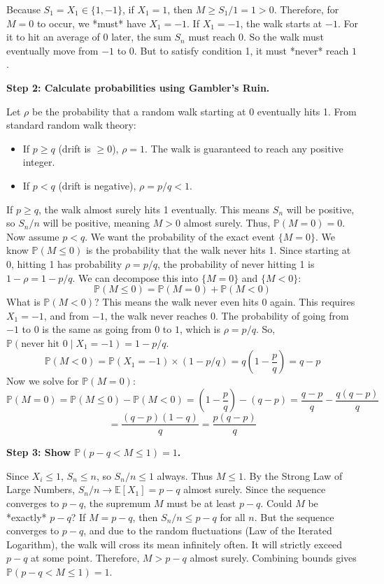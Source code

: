 \begin{solution}
Because $S_1 = X_1 \in \{1, -1\}$, if $X_1 = 1$, then $M \geq S_1/1 = 1 > 0$. Therefore, for $M=0$ to occur, we *must* have $X_1 = -1$.
If $X_1 = -1$, the walk starts at $-1$. For it to hit an average of 0 later, the sum $S_n$ must reach 0. So the walk must eventually move from $-1$ to $0$. But to satisfy condition 1, it must *never* reach $1$.

\textbf{Step 2: Calculate probabilities using Gambler's Ruin.}

Let $\rho$ be the probability that a random walk starting at 0 eventually hits 1. From standard random walk theory:
\begin{itemize}
    \item If $p \geq q$ (drift is $\ge 0$), $\rho = 1$. The walk is guaranteed to reach any positive integer.
    \item If $p < q$ (drift is negative), $\rho = p/q < 1$.
\end{itemize}

If $p \ge q$, the walk almost surely hits 1 eventually. This means $S_n$ will be positive, so $S_n/n$ will be positive, meaning $M > 0$ almost surely. Thus, $\mathbb{P}(M=0) = 0$.
Now assume $p < q$. We want the probability of the exact event $\{M=0\}$.
We know $\mathbb{P}(M \leq 0)$ is the probability that the walk never hits 1. Since starting at 0, hitting 1 has probability $\rho = p/q$, the probability of never hitting 1 is $1 - \rho = 1 - p/q$.
We can decompose this into $\{M=0\}$ and $\{M<0\}$:
\[ \mathbb{P}(M \leq 0) = \mathbb{P}(M=0) + \mathbb{P}(M < 0) \]
What is $\mathbb{P}(M < 0)$? This means the walk never even hits 0 again. This requires $X_1 = -1$, and from $-1$, the walk never reaches 0. The probability of going from $-1$ to $0$ is the same as going from $0$ to $1$, which is $\rho = p/q$.
So, $\mathbb{P}(\text{never hit 0} \mid X_1 = -1) = 1 - p/q$.
\[ \mathbb{P}(M < 0) = \mathbb{P}(X_1 = -1) \times (1 - p/q) = q \left(1 - \frac{p}{q}\right) = q - p \]
Now we solve for $\mathbb{P}(M=0)$:
\[ \mathbb{P}(M=0) = \mathbb{P}(M \leq 0) - \mathbb{P}(M < 0) = \left(1 - \frac{p}{q}\right) - (q - p) = \frac{q-p}{q} - \frac{q(q-p)}{q} \]
\[ = \frac{(q-p)(1-q)}{q} = \frac{p(q-p)}{q} \]

\textbf{Step 3: Show $\mathbb{P}(p-q < M \leq 1) = 1$.}

Since $X_i \leq 1$, $S_n \leq n$, so $S_n/n \leq 1$ always. Thus $M \leq 1$.
By the Strong Law of Large Numbers, $S_n/n \to \mathbb{E}[X_1] = p-q$ almost surely.
Since the sequence converges to $p-q$, the supremum $M$ must be at least $p-q$.
Could $M$ be *exactly* $p-q$? If $M = p-q$, then $S_n/n \leq p-q$ for all $n$. But the sequence converges to $p-q$, and due to the random fluctuations (Law of the Iterated Logarithm), the walk will cross its mean infinitely often. It will strictly exceed $p-q$ at some point.
Therefore, $M > p-q$ almost surely. Combining bounds gives $\mathbb{P}(p-q < M \leq 1) = 1$.


\end{solution}
